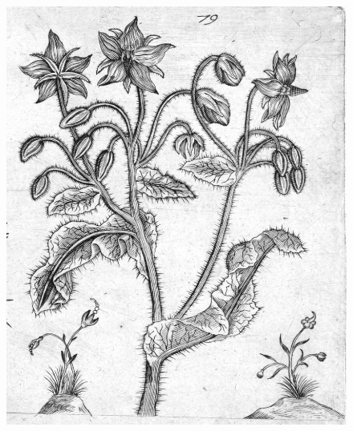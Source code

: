 {\begin{figure}[p]
  \begingroup
  \centering
  \includegraphics[keepaspectratio,width=\textwidth]{figures/borage-small.jpg}
  \label{fig:borage}
\end{figure}

\clearpage{}

\thispagestyle{titleontop}
}
